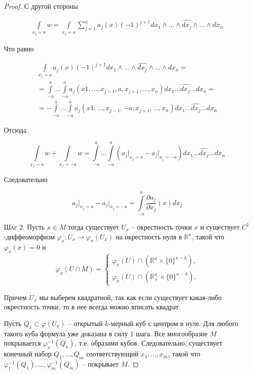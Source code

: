 \documentclass[a5paper]{article}
\theoremstyle{plain}
\theoremstyle{definition}
\numberwithin{through}{section}
\numberwithin{equation}{section}
\begin{document}
\begin{proof}
	С другой стороны
	
	\begin{multline*}
	\int\limits_{x_j = a} w = \int\limits_{x_j = a} \sum\limits_{j = 1}^{n} a_j(x) (-1)^{j+1} dx_1 \wedge \ldots \wedge \widehat{dx_j} \wedge \ldots \wedge dx_n
	\end{multline*}
	
	Что равно
	
	\begin{multline*}
	\int\limits_{x_j=a} a_j(x) (-1)^{j+1} dx_1 \wedge \ldots \wedge \widehat{dx_j} \wedge \ldots \wedge dx_n = \\ =\int\limits_{-a}^{a} \ldots \int\limits_{-a}^{a} a_j(x1, \ldots, x_{j-1}, a, x_{j+1}, \ldots, x_n) dx_1 \ldots \widehat{dx_j}\ldots dx_n = \\ = -\int\limits_{-a}^{a} \ldots \int\limits_{-a}^{a} a_j(x1, \ldots, x_{j-1}, -a, x_{j+1}, \ldots, x_n) dx_1 \ldots \widehat{dx_j}\ldots dx_n
	\end{multline*}
	
	Отсюда
	
	\begin{equation*}
	\int\limits_{x_j = a} w + \int\limits_{x_j = -a} w = \int\limits_{-a}^{a} \ldots \int\limits_{-a}^{a} \left(a_j \bigg|_{x_j = a} - a_j \bigg|_{x_j = -a}\right)dx_1 \ldots \widehat{dx_j}\ldots dx_n
	\end{equation*}
	
	Следовательно
	
	\begin{equation*}
	a_j \bigg|_{x_j = a} - a_j \bigg|_{x_j = -a} = \int\limits_{-a}^{a} \frac{\partial a_j}{\partial x_j} (x) dx_j
	\end{equation*}
	
	\textsc{Шаг 2.} Пусть $x \in M$ тогда существует $U_x$ -- окрестность точки $x$ и
	существует $C^1$-диффеоморфизм $\varphi_x: U_x \to \varphi_x(U_x)$ на окрестность нуля 
	в $\mathbb{R}^n$, такой что $\varphi_x(x)=0$ и 
	\[\varphi_x(U \cap M) =
	\begin{cases}
	\varphi_x (U) \cap (\mathbb{R}^n \times \{0\}^{n-k}), \\
	\varphi_x (U) \cap (\mathbb{R}^n_+ \times \{0\}^{n-k}).
	\end{cases}\]
	
	Причем $U_x$ мы выберем квадратной, так как если существует какая-либо окрестность точки,
	то в нее всегда можно вписать квадрат.
	
	
	Пусть $Q_x \subset \varphi(U_x)$ -- открытый $k$-мерный куб с центром в нуле. 
	Для любого такого куба формула уже доказана в силу 1 шага. 
	Все многообразие $M$ покрывается $\varphi_x^{-1} (Q_x)$, т.е. образами кубов.
	Следовательно, существует конечный набор $Q_1,\ldots, Q_m$ соответствующий $x_1,\ldots, x_m$, такой что
	$\varphi_1^{-1}(Q_1),\ldots, \varphi_m^{-1}(Q_m)$ -- покрывает $M$.
	

\end{proof}
\end{document}
